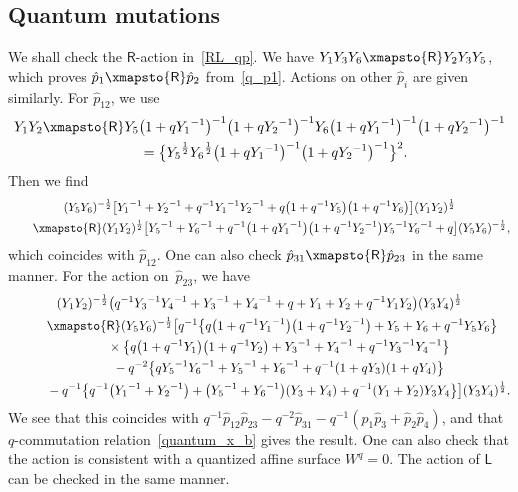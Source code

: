 \documentclass[pdftex]{sigma}
\numberwithin{equation}{section}
\begin{document}
\subsection{Quantum mutations}\label{sec:q_mutation}
We shall check the $\mathsf{R}$-action in~\eqref{RL_qp}. We have $ Y_1 Y_3 Y_6 \xmapsto{\mathsf{R}} Y_2 Y_3 Y_5$, which proves $\hat{p}_1 \xmapsto{\mathsf{R}} \hat{p}_2$ from~\eqref{q_p1}. Actions on other $\hat{p}_i$ are given similarly. For $\hat{p}_{12}$, we use
\begin{gather*}
 Y_1 Y_2 \xmapsto{\mathsf{R}} Y_5 \big( 1 + q {Y_1}^{-1} \big)^{-1} \big( 1 + q {Y_2}^{-1}\big)^{-1} Y_6 \big( 1 + q {Y_1}^{-1} \big)^{-1} \big( 1 + q {Y_2}^{-1}\big)^{-1} \\
\qquad{} = \big\{ {Y_5}^{\frac{1}{2}} {Y_6}^{\frac{1}{2}} \big( 1 + q {Y_1}^{-1} \big)^{-1} \big( 1 + q {Y_2}^{-1} \big)^{-1} \big\}^2 .
\end{gather*}
Then we find
\begin{gather*}
( Y_5 Y_6)^{-\frac{1}{2}} \big[ {Y_1}^{-1} + {Y_2}^{-1} + q^{-1} {Y_1}^{-1} {Y_2}^{-1} + q \big( 1 + q^{-1} Y_5\big)\big( 1 + q^{-1} Y_6\big)\big] ( Y_1 Y_2)^{\frac{1}{2}} \\
\qquad{} \xmapsto{\mathsf{R}} ( Y_1 Y_2)^{\frac{1}{2}} \big[ {Y_5}^{-1} + {Y_6}^{-1} + q^{-1} \big( 1+ q {Y_1}^{-1} \big) \big( 1 + q^{-1} {Y_2}^{-1} \big) {Y_5}^{-1} {Y_6}^{-1} + q \big]
( Y_5 Y_6)^{-\frac{1}{2}} ,
\end{gather*}
which coincides with $\hat{p}_{12}$. One can also check $ \hat{p}_{31} \xmapsto{\mathsf{R}} \hat{p}_{23}$ in the same manner. For the action on~$\hat{p}_{23}$, we have
\begin{gather*}
(Y_1 Y_2)^{-\frac{1}{2}}\big( q^{-1} {Y_3}^{-1} {Y_4}^{-1} + {Y_3}^{-1} + {Y_4}^{-1} + q + Y_1 + Y_2 + q^{-1} Y_1 Y_2 \big) ( Y_3 Y_4)^{\frac{1}{2}} \\
\qquad{} \xmapsto{\mathsf{R}}( Y_5 Y_6)^{-\frac{1}{2}} \big[ q^{-1} \big\{ q \big(1+ q^{-1} {Y_1}^{-1}\big)\big( 1 + q^{-1} {Y_2}^{-1}\big) + Y_5 + Y_6 + q^{-1} Y_5 Y_6\big\} \\
 \qquad\quad{} \times \big\{ q \big( 1 +q^{-1} Y_1\big) \big( 1 + q^{-1} Y_2\big) + {Y_3}^{-1} +{Y_4}^{-1} + q^{-1} {Y_3}^{-1} {Y_4}^{-1} \big\} \\
\qquad\quad {} - q^{-2} \big\{ q {Y_5}^{-1} {Y_6}^{-1} + {Y_5}^{-1} + {Y_6}^{-1}+ q^{-1} ( 1 + q Y_3 ) ( 1 + q Y_4 ) \big\} \\
\qquad\quad {} -q^{-1} \big\{ q^{-1} \big( {Y_1}^{-1} + {Y_2}^{-1} \big) + \big( {Y_5}^{-1} + {Y_6}^{-1}\big) ( Y_3 + Y_4 ) + q^{-1} ( Y_1 + Y_2 ) Y_3 Y_4 \big\}\big]( Y_3 Y_4)^{\frac{1}{2}} .
 \end{gather*}
We see that this coincides with $q^{-1} \hat{p}_{12} \hat{p}_{23}-q^{-2} \hat{p}_{31}- q^{-1} ( \hat{p}_1 \hat{p}_3 + \hat{p}_2 \hat{p}_4 ) $, and that $q$-commutation relation~\eqref{quantum_x_b} gives the result. One can also check that the action is consistent with a quantized affine surface $W^q=0$. The action of $\mathsf{L}$ can be checked in the same manner.
\end{document}
